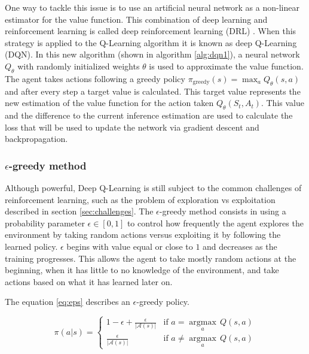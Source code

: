 One way to tackle this issue is to use an artificial neural network as a non-linear estimator for the value function. This combination of deep learning and reinforcement learning is called deep reinforcement learning (DRL) \cite{Mnih:2013}. When this strategy is applied to the Q-Learning algorithm it is known as deep Q-Learning (DQN). In this new algorithm (shown in algorithm \ref{alg:dqn1}), a neural network $Q_\theta$ with randomly initialized weights $\theta$ is used to approximate the value function. The agent takes actions following a greedy policy $\pi_\textrm{greedy}(s) = \max_a Q_\theta(s,a)$ and after every step a target value is calculated. This target value represents the new estimation of the value function for the action taken $Q_\theta(S_t, A_t)$. This value and the difference to the current inference estimation are used to calculate the loss that will be used to update the network via gradient descent and backpropagation.

\subsubsection*{$\epsilon$-greedy method}

Although powerful, Deep Q-Learning is still subject to the common challenges of reinforcement learning, such as the problem of exploration vs exploitation described in section \ref{sec:challenges}. The $\epsilon$-greedy method consists in using a probability parameter $\epsilon \in [0,1]$ to control how frequently the agent explores the environment by taking random actions versus exploiting it by following the learned policy. $\epsilon$ begins with value equal or close to $1$ and decreases as the training progresses. This allows the agent to take mostly random actions at the beginning, when it has little to no knowledge of the environment, and take actions based on what it has learned later on.

The equation \ref{eq:eps} describes an $\epsilon$-greedy policy.

\begin{equation}
\label{eq:eps}
    \pi(a|s) =
    \begin{cases}
        1-\epsilon + \frac{\epsilon}{|\mathcal{A}(s)|} & \textrm{if $a = \underset{a}{\operatorname{argmax}}\,Q(s, a)$}\\
        \frac{\epsilon}{|\mathcal{A}(s)|} & \textrm{if $a \neq \underset{a}{\operatorname{argmax}}\,Q(s, a)$}
    \end{cases}
\end{equation}

